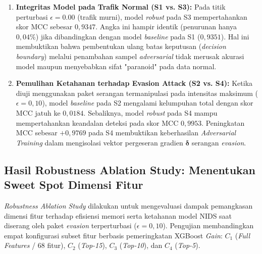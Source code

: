 \documentclass[11pt, a4paper]{article}
\begin{document}
\begin{enumerate}
    \item \textbf{Integritas Model pada Trafik Normal (S1 vs. S3):} 
    Pada titik perturbasi $\epsilon = 0.00$ (trafik murni), model \textit{robust} pada S3 mempertahankan skor MCC sebesar $0{,}9347$. Angka ini hampir identik (penurunan hanya $0{,}04\%$) jika dibandingkan dengan model \textit{baseline} pada S1 ($0{,}9351$). Hal ini membuktikan bahwa pembentukan ulang batas keputusan (\textit{decision boundary}) melalui penambahan sampel \textit{adversarial} tidak merusak akurasi model maupun menyebabkan sifat "paranoid" pada data normal.

    \item \textbf{Pemulihan Ketahanan terhadap Evasion Attack (S2 vs. S4):} 
    Ketika diuji menggunakan paket serangan termanipulasi pada intensitas maksimum ($\epsilon = 0{,}10$), model \textit{baseline} pada S2 mengalami kelumpuhan total dengan skor MCC jatuh ke $0{,}0184$. Sebaliknya, model \textit{robust} pada S4 mampu mempertahankan keandalan deteksi pada skor MCC $0{,}9953$. Peningkatan MCC sebesar $+0{,}9769$ pada S4 membuktikan keberhasilan \textit{Adversarial Training} dalam mengisolasi vektor pergeseran gradien $\boldsymbol{\delta}$ serangan \textit{evasion}.
\end{enumerate}


\subsection{Hasil Robustness Ablation Study: Menentukan Sweet Spot Dimensi Fitur}
\textit{Robustness Ablation Study} dilakukan untuk mengevaluasi dampak pemangkasan dimensi fitur terhadap efisiensi memori serta ketahanan model NIDS saat diserang oleh paket \textit{evasion} terperturbasi ($\epsilon = 0{,}10$). Pengujian membandingkan empat konfigurasi subset fitur berbasis pemeringkatan XGBoost \textit{Gain}: $C_1$ (\textit{Full Features} / 68 fitur), $C_2$ (\textit{Top-15}), $C_3$ (\textit{Top-10}), dan $C_4$ (\textit{Top-5}).
\end{document}
